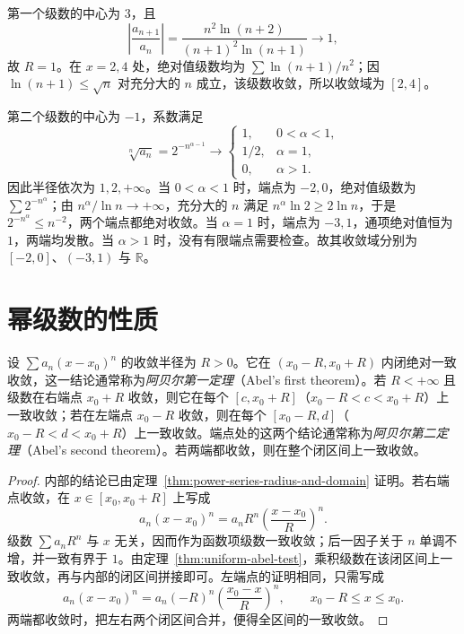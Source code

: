 \documentclass[UTF8,12pt,a4paper,fontset=fandol]{ctexbook}
\begin{document}
\begin{solve}
第一个级数的中心为 $3$，且
\[
    \left|\frac{a_{n+1}}{a_n}\right|
    =\frac{n^2\ln(n+2)}{(n+1)^2\ln(n+1)}\longrightarrow1,
\]
故 $R=1$。在 $x=2,4$ 处，绝对值级数均为 $\sum\ln(n+1)/n^2$；因 $\ln(n+1)\leq\sqrt n$ 对充分大的 $n$ 成立，该级数收敛，所以收敛域为 $[2,4]$。

第二个级数的中心为 $-1$，系数满足
\[
    \sqrt[n]{a_n}=2^{-n^{\alpha-1}}
    \longrightarrow
    \begin{cases}
        1,&0<\alpha<1,\\
        1/2,&\alpha=1,\\
        0,&\alpha>1.
    \end{cases}
\]
因此半径依次为 $1,2,+\infty$。当 $0<\alpha<1$ 时，端点为 $-2,0$，绝对值级数为 $\sum2^{-n^\alpha}$；由 $n^\alpha/\ln n\to+\infty$，充分大的 $n$ 满足 $n^\alpha\ln2\geq2\ln n$，于是 $2^{-n^\alpha}\leq n^{-2}$，两个端点都绝对收敛。当 $\alpha=1$ 时，端点为 $-3,1$，通项绝对值恒为 $1$，两端均发散。当 $\alpha>1$ 时，没有有限端点需要检查。故其收敛域分别为 $[-2,0]$、$(-3,1)$ 与 $\mathbb R$。
\end{solve}

\section{幂级数的性质}
\label{sec:properties-of-power-series}

\begin{theorem}[阿贝尔定理]
\label{thm:abel-power-series-uniform-convergence}
设 $\sum a_n(x-x_0)^n$ 的收敛半径为 $R>0$。它在 $(x_0-R,x_0+R)$ 内闭绝对一致收敛，这一结论通常称为\emph{阿贝尔第一定理}（Abel's first theorem）。若 $R<+\infty$ 且级数在右端点 $x_0+R$ 收敛，则它在每个 $[c,x_0+R]$（$x_0-R<c<x_0+R$）上一致收敛；若在左端点 $x_0-R$ 收敛，则在每个 $[x_0-R,d]$（$x_0-R<d<x_0+R$）上一致收敛。端点处的这两个结论通常称为\emph{阿贝尔第二定理}（Abel's second theorem）。若两端都收敛，则在整个闭区间上一致收敛。
\end{theorem}

\begin{proof}
内部的结论已由定理~\ref{thm:power-series-radius-and-domain} 证明。若右端点收敛，在 $x\in[x_0,x_0+R]$ 上写成
\[
    a_n(x-x_0)^n=a_nR^n
        \left(\frac{x-x_0}{R}\right)^n.
\]
级数 $\sum a_nR^n$ 与 $x$ 无关，因而作为函数项级数一致收敛；后一因子关于 $n$ 单调不增，并一致有界于 $1$。由定理~\ref{thm:uniform-abel-test}，乘积级数在该闭区间上一致收敛，再与内部的闭区间拼接即可。左端点的证明相同，只需写成
\[
    a_n(x-x_0)^n=a_n(-R)^n
        \left(\frac{x_0-x}{R}\right)^n,
    \qquad x_0-R\leq x\leq x_0.
\]
两端都收敛时，把左右两个闭区间合并，便得全区间的一致收敛。
\end{proof}
\end{document}
